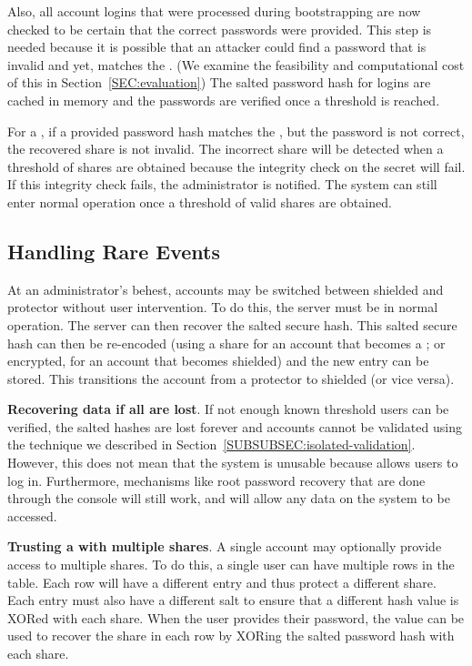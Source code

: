 Also, all account logins that were processed during bootstrapping are now
checked to be certain that the correct passwords were provided.  This step is
needed because it is possible that an attacker could find a password that is
invalid and yet, matches the \partialbytes.  (We examine the feasibility and
computational cost of this in Section~\ref{SEC:evaluation})  The salted
password hash for \thresholdlessaccount logins are cached in memory and the
passwords are verified once a threshold is reached.

For a \thresholdaccount , if a provided password hash matches the \partialbytes,
but the password is not correct, the recovered share is not invalid.  The
incorrect share will be detected when a threshold of shares are obtained
because the integrity check on the secret will fail.  If this integrity check
fails, the administrator is notified.  The system can still enter normal
operation once a threshold of valid shares are obtained.  

\subsection{Handling Rare Events}
\label{SUBSEC:handling-rare-events}

At an administrator's behest, accounts may be switched between shielded
and protector without user intervention. To do this, the server must be in
normal operation.  The server can then recover the salted secure hash. This
salted secure hash can then be re-encoded (using a share for an account that
becomes a \thresholdaccount; or encrypted, for an account that becomes
shielded) and the new entry can be stored. This transitions the account
from a protector to shielded (or vice versa).

{\bf Recovering data if all \thresholdaccounts are lost}.  If not enough
known threshold users can be verified, the salted hashes are lost forever and
accounts cannot be validated using the technique we described in
Section~\ref{SUBSUBSEC:isolated-validation}.  However, this does not mean that
the system is unusable because \partialverification allows users to log in.
Furthermore, mechanisms like root password recovery that are done through the console
will still work, and will allow any data on the system to be accessed.

{\bf Trusting a \thresholdaccount with multiple shares}.  A single
account may optionally provide access to multiple shares. 
To do this, a single user can have multiple rows in the table.  Each 
row will have a different \sxh entry and thus protect a different share.
Each entry must also have a different salt to ensure that a different
hash value is XORed with each share.  When the user provides their password,
the value can be used to recover the share in each row by XORing the salted
password hash with each share.

